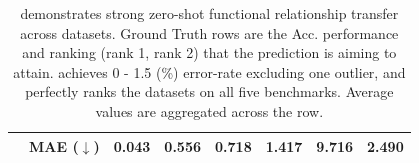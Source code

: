 \begin{table}[tb]
{\begin{tabular}{l|l|ccccc|c}
 & \cellcolor{gray!30}\textbf{MAE ($\downarrow$)} & \cellcolor{gray!30} 0.043 & \cellcolor{gray!30}0.556 & \cellcolor{gray!30}0.718 & \cellcolor{gray!30}1.417 & \cellcolor{gray!30}9.716 & \cellcolor{gray!30} \textbf{2.490} \\
\bottomrule
\end{tabular}
}
\caption{ demonstrates strong zero-shot functional relationship transfer across datasets. Ground Truth rows are the Acc. performance and ranking ({\setlength{\fboxsep}{2pt}\colorbox{mygreen!30}{rank 1}, \colorbox{myred!30}{rank 2}}) that the prediction is aiming to attain.  achieves 0 - 1.5 (\%) error-rate excluding one outlier, and perfectly ranks the datasets on all five benchmarks. Average values are aggregated across the row. }\label{tab:function}
\end{table}


